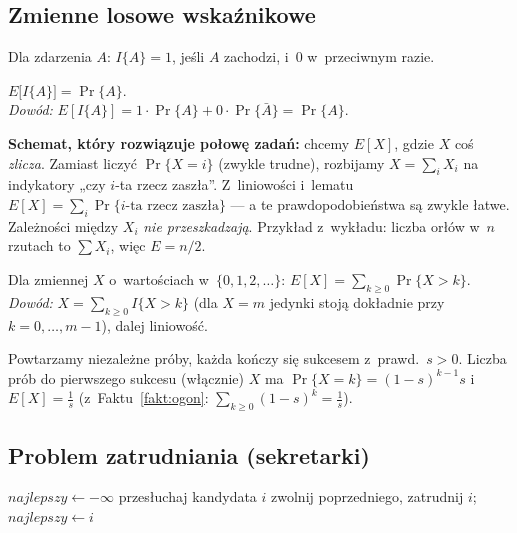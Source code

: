 \documentclass[11pt]{article}
\begin{document}
\subsection*{Zmienne losowe wskaźnikowe}

\begin{definicja}[Indykator]
Dla zdarzenia $A$: $I\{A\}=1$, jeśli $A$ zachodzi, i~$0$ w~przeciwnym razie.
\end{definicja}

\begin{lemat}[z wykładu]\label{lem:ind}
$E\bigl[I\{A\}\bigr]=\Pr\{A\}$.\\ \emph{Dowód:}
$E[I\{A\}]=1\cdot\Pr\{A\}+0\cdot\Pr\{\bar A\}=\Pr\{A\}$.
\end{lemat}

\begin{intuicja}
\textbf{Schemat, który rozwiązuje połowę zadań:} chcemy $E[X]$, gdzie $X$ coś
\emph{zlicza}. Zamiast liczyć $\Pr\{X=i\}$ (zwykle trudne), rozbijamy
$X=\sum_iX_i$ na indykatory „czy $i$-ta rzecz zaszła”. Z~liniowości i~lematu
$E[X]=\sum_i\Pr\{\text{$i$-ta rzecz zaszła}\}$ --- a te prawdopodobieństwa są
zwykle łatwe. Zależności między $X_i$ \emph{nie przeszkadzają}.
Przykład z~wykładu: liczba orłów w~$n$ rzutach to $\sum X_i$, więc $E=n/2$.
\end{intuicja}

\begin{fakt}\label{fakt:ogon}
Dla zmiennej $X$ o~wartościach w~$\{0,1,2,\ldots\}$:
$E[X]=\sum_{k\ge0}\Pr\{X>k\}$. \emph{Dowód:} $X=\sum_{k\ge0}I\{X>k\}$
(dla $X=m$ jedynki stoją dokładnie przy $k=0,\dots,m-1$), dalej liniowość.
\end{fakt}

\begin{fakt}\label{fakt:geom}
Powtarzamy niezależne próby, każda kończy się sukcesem z~prawd.\ $s>0$.
Liczba prób do pierwszego sukcesu (włącznie) $X$ ma
$\Pr\{X=k\}=(1-s)^{k-1}s$ i~$E[X]=\frac1s$ (z~Faktu~\ref{fakt:ogon}:
$\sum_{k\ge0}(1-s)^k=\frac1s$).
\end{fakt}

\subsection*{Problem zatrudniania (sekretarki)}

\begin{algorithm}[H]
\caption{\textsc{Zatrudnij} (z wykładu)}
\begin{algorithmic}[1]
\State $\mathit{najlepszy}\gets-\infty$
  \State przesłuchaj kandydata $i$
     \State zwolnij poprzedniego, zatrudnij $i$; $\mathit{najlepszy}\gets i$
  \EndIf
\EndFor
\end{algorithmic}
\end{algorithm}
\end{document}

